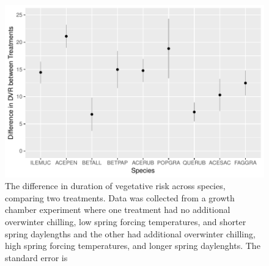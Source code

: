 \documentclass{article}\usepackage[]{graphicx}\usepackage[]{color}
\makeatletter
\def\maxwidth{ %
  \ifdim\Gin@nat@width>\linewidth
    \linewidth
  \else
    \Gin@nat@width
  \fi
}
\makeatother
\begin{document}
\begin{figure}[H]

{\centering \includegraphics[width=\maxwidth]{figure/dan-1} 

}

\caption[The difference in duration of vegetative risk across species, comparing two treatments]{The difference in duration of vegetative risk across species, comparing two treatments. Data was collected from a growth chamber experiment where one treatment had no additional overwinter chilling, low spring forcing temperatures, and shorter spring daylengths and the other had additional overwinter chilling, high spring forcing temperatures, and longer spring daylenghts. The standard error is }\label{fig:dan}
\end{figure}
\end{document}
